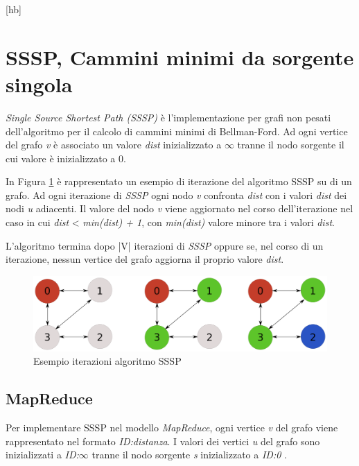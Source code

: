 \documentclass[LaM,binding=0.6cm]{sapthesis}
\begin{document}
\begin{minipage}{\linewidth}[hb]

\end{minipage}

	\section{SSSP, Cammini minimi da sorgente singola}

\textit{Single Source Shortest Path (SSSP)} è l'implementazione per grafi non pesati dell'algoritmo per il calcolo di cammini minimi di Bellman-Ford. Ad ogni vertice del grafo \textit{v} è associato un valore \textit{dist} inizializzato a $\infty$ tranne il nodo sorgente il cui valore è inizializzato a 0.

In Figura \ref{fig:SSSP} è rappresentato un esempio di iterazione del algoritmo SSSP su di un grafo. 
Ad ogni iterazione di \textit{SSSP} ogni nodo \textit{v} confronta \textit{dist} con i valori \textit{dist} dei nodi \textit{u} adiacenti.
Il valore del nodo \textit{v} viene aggiornato nel corso dell'iterazione nel caso in cui \textit{dist} < \textit{min(dist) + 1}, con \textit{min(dist)} valore minore tra i valori \textit{dist}. 

L'algoritmo termina dopo |V| iterazioni di \textit{SSSP} oppure se, nel corso di un iterazione, nessun vertice del grafo aggiorna il proprio valore \textit{dist}. 


\begin{figure}[hb]
\centering
\includegraphics[width=1\textwidth]{SSSP}
\caption{Esempio iterazioni algoritmo SSSP}
\label{fig:SSSP}
\end{figure}


\subsection{MapReduce}

Per implementare SSSP nel modello \textit{MapReduce}, ogni vertice \textit{v} del grafo viene rappresentato nel formato \textit{ID:distanza}. I valori dei vertici \textit{u} del grafo  sono inizializzati a \textit{ID:$\infty$} tranne il nodo sorgente \textit{s} inizializzato a \textit{ID:0 }.
\end{document}
